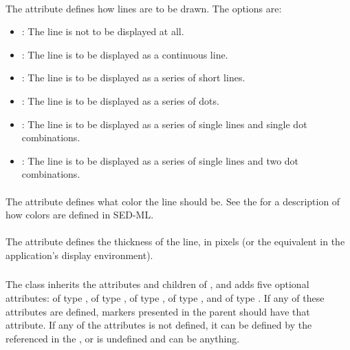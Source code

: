 \begin{blockChanged}
\paragraph*{}

The  attribute defines how lines are to be drawn.  The options are:

\begin{itemize}
        \item \textbf{}: The line is not to be displayed at all.
        \item \textbf{}: The line is to be displayed as a continuous line.
        \item \textbf{}: The line is to be displayed as a series of short lines.
        \item \textbf{}: The line is to be displayed as a series of dots.
        \item \textbf{}: The line is to be displayed as a series of single lines and single dot combinations.
        \item \textbf{}: The line is to be displayed as a series of single lines and two dot combinations.
\end{itemize}

\paragraph*{}

The  attribute defines what color the line should be.  See the \SedColor for a description of how colors are defined in SED-ML.

\paragraph*{}

The  attribute defines the thickness of the line, in pixels (or the equivalent in the application's display environment).


\subsubsection{}
\label{class:marker}

The \Marker class inherits the attributes and children of \SedBase, and adds five optional attributes:  of type \MarkerType,  of type ,  of type \SedColor,  of type \SedColor, and  of type .  If any of these attributes are defined, markers presented in the parent \Style should have that attribute.  If any of the attributes is not defined, it can be defined by the \Style referenced in the , or is undefined and can be anything.


\end{blockChanged}
